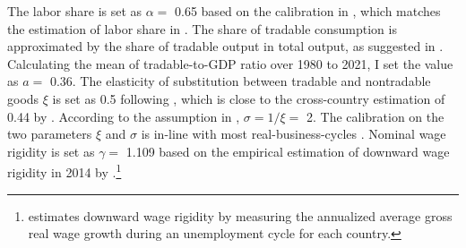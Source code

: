 The labor share is set as $\alpha=$ 0.65 based on the calibration in \citet*{Jegajeevan-Sri-Lanka-DSGE}, which matches the estimation of labor share in \citet{duma2007sri}. The share of tradable consumption is approximated by the share of tradable output in total output, as suggested in \citet{Uribe-Schmitt-Grohe-textbook}. Calculating the mean of tradable-to-GDP ratio over 1980 to 2021, I set the value as $a =$ 0.36. The elasticity of substitution between tradable and nontradable goods $\xi$ is set as 0.5 following \citet{Uribe-Schmitt-Grohe-textbook}, which is close to the cross-country estimation of 0.44 by \citet*{Stockman-Tesar-95}. According to the assumption in , $\sigma=1/\xi=$ 2. The calibration on the two parameters $\xi$ and $\sigma$ is in-line with most real-business-cycles \citep{Uribe-Schmitt-Grohe-textbook,Na-18}. Nominal wage rigidity is set as $\gamma=$ 1.109 based on the empirical estimation of downward wage rigidity in 2014 by \citet*{wage-rigidity-data}.\footnote{
    \citet{wage-rigidity-data} estimates downward wage rigidity by measuring the annualized average gross real wage growth during an unemployment cycle for each country.
    }

